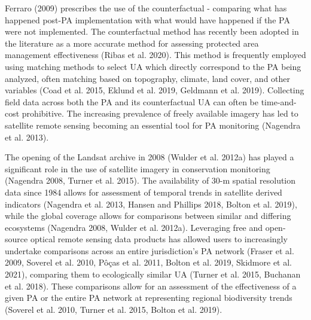 \documentclass[10pt,oneside]{article}
\begin{document}
Ferraro (2009) prescribes the use of the counterfactual - comparing what
has happened post-PA implementation with what would have happened if the
PA were not implemented. The counterfactual method has recently been
adopted in the literature as a more accurate method for assessing
protected area management effectiveness (Ribas et al. 2020). This method
is frequently employed using matching methods to select UA which
directly correspond to the PA being analyzed, often matching based on
topography, climate, land cover, and other variables (Coad et al. 2015,
Eklund et al. 2019, Geldmann et al. 2019). Collecting field data across
both the PA and its counterfactual UA can often be time-and-cost
prohibitive. The increasing prevalence of freely available imagery has
led to satellite remote sensing becoming an essential tool for PA
monitoring (Nagendra et al. 2013).

The opening of the Landsat archive in 2008 (Wulder et al. 2012a) has
played a significant role in the use of satellite imagery in
conservation monitoring (Nagendra 2008, Turner et al. 2015). The
availability of 30-m spatial resolution data since 1984 allows for
assessment of temporal trends in satellite derived indicators (Nagendra
et al. 2013, Hansen and Phillips 2018, Bolton et al. 2019), while the
global coverage allows for comparisons between similar and differing
ecosystems (Nagendra 2008, Wulder et al. 2012a). Leveraging free and
open-source optical remote sensing data products has allowed users to
increasingly undertake comparisons across an entire jurisdiction's PA
network (Fraser et al. 2009, Soverel et al. 2010, Pôças et al. 2011,
Bolton et al. 2019, Skidmore et al. 2021), comparing them to
ecologically similar UA (Turner et al. 2015, Buchanan et al. 2018).
These comparisons allow for an assessment of the effectiveness of a
given PA or the entire PA network at representing regional biodiversity
trends (Soverel et al. 2010, Turner et al. 2015, Bolton et al. 2019).
\end{document}
